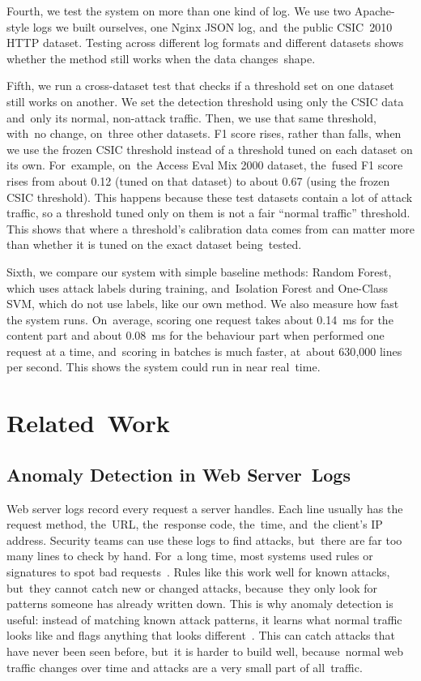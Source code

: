 \documentclass[futureinternet,article,accept,moreauthors]{Definitions/mdpi}
\begin{document}
Fourth, we test the system on more than one kind of log. We use two Apache-style logs we built ourselves, one Nginx JSON log, and~the public CSIC~2010 HTTP dataset. Testing across different log formats and different datasets shows whether the method still works when the data changes~shape.

Fifth, we run a cross-dataset test that checks if a threshold set on one dataset still works on another. We set the detection threshold using only the CSIC data and~only its normal, non-attack traffic. Then, we use that same threshold, with~no change, on~three other datasets. F1 score rises, rather than falls, when we use the frozen CSIC threshold instead of a threshold tuned on each dataset on its own. For~example, on~the Access Eval Mix 2000 dataset, the~fused F1 score rises from about 0.12 (tuned on that dataset) to about 0.67 (using the frozen CSIC threshold). This happens because these test datasets contain a lot of attack traffic, so a threshold tuned only on them is not a fair ``normal traffic'' threshold. This shows that where a threshold's calibration data comes from can matter more than whether it is tuned on the exact dataset being~tested.

Sixth, we compare our system with simple baseline methods: Random Forest, which uses attack labels during training, and~Isolation Forest and One-Class SVM, which do not use labels, like our own method. We also measure how fast the system runs. On~average, scoring one request takes about 0.14~ms for the content part and about 0.08~ms for the behaviour part when performed one request at a time, and~scoring in batches is much faster, at~about 630{,}000 lines per second. This shows the system could run in near real~time.

\section{Related~Work} \label{sec3}
\unskip

\subsection{Anomaly Detection in Web Server~Logs}

Web server logs record every request a server handles. Each line usually has the request method, the~URL, the~response code, the~time, and~the client's IP address. Security teams can use these logs to find attacks, but~there are far too many lines to check by hand. For~a long time, most systems used rules or signatures to spot bad requests~\cite{scarfone2007}. Rules like this work well for known attacks, but~they cannot catch new or changed attacks, because~they only look for patterns someone has already written down. This is why anomaly detection is useful: instead of matching known attack patterns, it learns what normal traffic looks like and flags anything that looks different~\cite{chandola2009}. This can catch attacks that have never been seen before, but~it is harder to build well, because~normal web traffic changes over time and attacks are a very small part of all~traffic.
\end{document}
